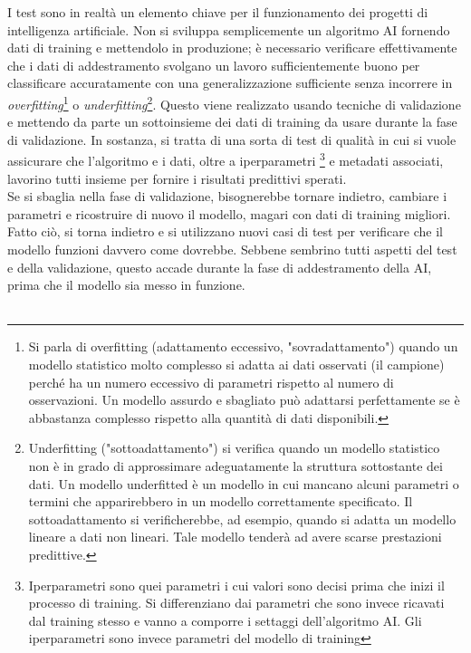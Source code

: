 \documentclass[a4paper,12pt]{report}
\begin{document}
I test sono in realtà un elemento chiave per il funzionamento dei progetti di intelligenza artificiale. Non si sviluppa semplicemente un algoritmo AI fornendo dati di training e mettendolo in produzione; è necessario verificare effettivamente che i dati di addestramento svolgano un lavoro sufficientemente buono per classificare accuratamente con una generalizzazione sufficiente senza incorrere in \textit{overfitting}\footnote{Si parla di overfitting (adattamento eccessivo, "sovradattamento") quando un modello statistico molto complesso si adatta ai dati osservati (il campione) perché ha un numero eccessivo di parametri rispetto al numero di osservazioni. Un modello assurdo e sbagliato può adattarsi perfettamente se è abbastanza complesso rispetto alla quantità di dati disponibili.} o \textit{underfitting}\footnote{Underfitting ("sottoadattamento") si verifica quando un modello statistico non è in grado di approssimare adeguatamente la struttura sottostante dei dati. Un modello underfitted è un modello in cui mancano alcuni parametri o termini che apparirebbero in un modello correttamente specificato. Il sottoadattamento si verificherebbe, ad esempio, quando si adatta un modello lineare a dati non lineari. Tale modello tenderà ad avere scarse prestazioni predittive.}. Questo viene realizzato usando tecniche di validazione e mettendo da parte un sottoinsieme dei dati di training da usare durante la fase di validazione. In sostanza, si tratta di una sorta di test di qualità in cui si vuole assicurare che l'algoritmo e i dati, oltre a iperparametri \footnote{Iperparametri sono quei parametri i cui valori sono decisi prima che inizi il processo di training. Si differenziano dai parametri che sono invece ricavati dal training stesso e vanno a comporre i settaggi dell'algoritmo AI. Gli iperparametri sono invece parametri del modello di training} e metadati associati, lavorino tutti insieme per fornire i risultati predittivi sperati.\\
Se si sbaglia nella fase di validazione, bisognerebbe tornare indietro, cambiare i parametri e ricostruire di nuovo il modello, magari con dati di training migliori. Fatto ciò, si torna indietro e si utilizzano nuovi casi di test per verificare che il modello funzioni davvero come dovrebbe. Sebbene sembrino tutti aspetti del test e della validazione, questo accade durante la fase di addestramento della AI, prima che il modello sia messo in funzione.\\~\\
\end{document}
